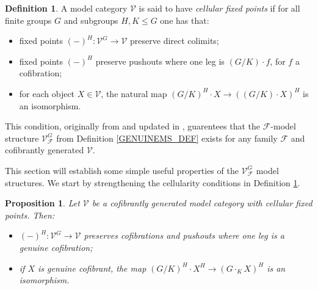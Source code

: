 \documentclass[a4paper,10pt
,draft
]{article}%
\numberwithin{equation}{section}
\numberwithin{figure}{section}
\newtheorem{proposition}[equation]{Proposition}%
\theoremstyle{definition} %
\newtheorem{definition}[equation]{Definition}%
\newcommand{\F}{\ensuremath{\mathcal F}}
\newcommand{\V}{\ensuremath{\mathcal V}}
\newcommand{\1}{\ensuremath{\mathbbm 1}}%
\begin{document}
\begin{definition}\label{CELL DEF}
	A model category $\mathcal{V}$ is said to have 
	\textit{cellular fixed points} if for all finite groups $G$ and subgroups $H,K\leq G$ one has that:
\begin{itemize}
	\item[(i)] fixed points $(\minus)^H \colon \mathcal{V}^G \to \mathcal{V}$ preserve direct colimits;
	\item[(ii)] fixed points $(\minus)^H$ preserve pushouts where one leg is $(G/K)\cdot f$, for $f$ a cofibration;
	\item[(iii)] for each object $X \in \mathcal{V}$, the natural map 
	$(G/K)^H \cdot X \to ((G/K) \cdot X)^H$
	is an isomorphism.
\end{itemize}
\end{definition}

This condition, originally from \cite{Gui06} and updated in \cite{Ste16}, guarentees that
the $\F$-model structure $\V^G_{\F}$ from Definition \ref{GENUINEMS_DEF} exists for any family $\F$ and cofibrantly generated $\V$.

This section will establish some simple useful properties of the $\mathcal{V}^G_{\mathcal{F}}$ model structures. We start by strengthening the 
cellularity conditions in Definition \ref{CELL DEF}.

\begin{proposition}\label{STRONGCELL PROP}
	Let $\mathcal{V}$ be a cofibrantly generated model category with cellular fixed points. Then:
	\begin{itemize}
		\item[(i)] $(\minus)^H \colon \mathcal{V}^G \to \mathcal{V}$ preserves cofibrations and pushouts where one leg
			 is a genuine cofibration;
		\item[(ii)] if $X$ is genuine cofibrant, the map 
			$(G/K)^H \cdot X^H \to (G \cdot_K X)^H$ is an isomorphism.
	\end{itemize}
\end{proposition}
\end{document}
